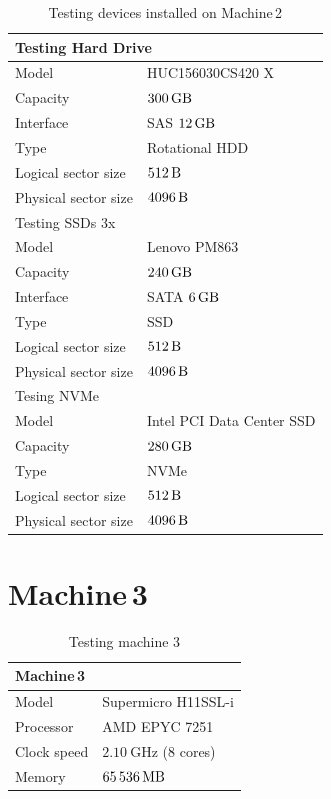 \documentclass[
  color, %
  table, %
  lof,   %
  lot,   %
]{fithesis3}
\begin{document}
\begin{table}[!htb]
\centering
\begin{tabular}{|l|l|}
\hline
   \multicolumn{2}{|l|}{Testing Hard Drive} \\ \hline %
    Model & HUC156030CS420 X\\
    \hline
    Capacity & $\SI{300}{\giga\byte}$  \\
    \hline
    Interface & SAS $\SI{12}{\giga\byte}$  \\
    \hline
    Type & Rotational HDD \\
    \hline    
    Logical sector size & $\SI{512}{\byte}$ \\    
    \hline    
    Physical sector size & $\SI{4096}{\byte}$ \\
    \hline
    \hline
    \multicolumn{2}{|l|}{Testing SSDs 3x } \\ \hline %
     Model & Lenovo PM863 \\
    \hline
     Capacity & $\SI{240}{\giga\byte}$  \\
    \hline
    Interface & SATA $\SI{6}{\giga\byte}$  \\
    \hline
    Type & SSD \\
    \hline    
    Logical sector size & $\SI{512}{\byte}$ \\    
    \hline    
     Physical sector size & $\SI{4096}{\byte}$ \\
    \hline

    \hline
    \multicolumn{2}{|l|}{Tesing NVMe} \\ \hline %
     Model & Intel PCI Data Center SSD \\
    \hline
     Capacity & $\SI{280}{\giga\byte}$  \\
    \hline
    Type & NVMe \\
    \hline    
    Logical sector size & $\SI{512}{\byte}$ \\    
    \hline    
     Physical sector size & $\SI{4096}{\byte}$ \\

    \hline
\end{tabular}
\caption{Testing devices installed on Machine\,2}
\end{table}

\clearpage
\section{Machine\,3}
\label{hw:3}
\begin{table}[!htb]
\centering
\begin{tabular}{|l|l|}
\hline
   \multicolumn{2}{|l|}{Machine\,3} \\ \hline %
    Model & Supermicro H11SSL-i\\
    \hline
    Processor & AMD EPYC 7251  \\
    \hline
    Clock speed & $\SI{2.10}{\giga\hertz}$ (8 cores) \\
    \hline
    Memory & $\SI{65536}{\mega\byte}$ \\
    \hline
\end{tabular}
\caption{Testing machine 3}
\end{table}
\end{document}
